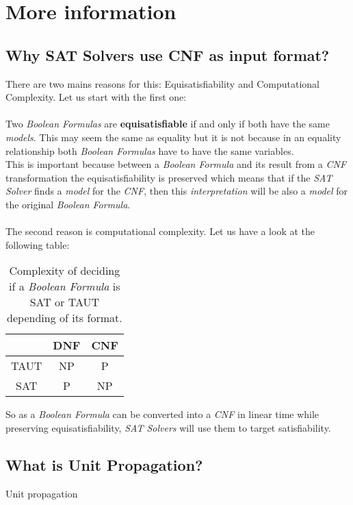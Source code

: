 
\chapter{More information} %

\label{AppendixA} %

\section{Why SAT Solvers use CNF as input format?}
\label{A.1}

There are two mains reasons for this: Equisatisfiability and Computational Complexity. Let us start with the first one: \\\\

Two \emph{Boolean Formulas} are \textbf{equisatisfiable} if and only if both have the same \emph{models}. This may seem the same as equality but it is not because in an equality relationship both \emph{Boolean Formulas} have to have the same variables. \\
This is important because between a \emph{Boolean Formula} and its result from a \emph{CNF} transformation the equisatisfiability is preserved which means that if the \emph{SAT Solver} finds a \emph{model} for the \emph{CNF}, then this \emph{interpretation} will be also a \emph{model} for the original \emph{Boolean Formula}.\\\\

The second reason is computational complexity. Let us have a look at the following table:

\begin{table}[h]
	\centering
	\begin{tabular}{c|c|c|}
		\cline{2-3}
		& DNF & CNF \\ \hline\hline
		\multicolumn{1}{|c||}{TAUT} & NP  & P   \\ \hline
		\multicolumn{1}{|c||}{SAT}  & P   & NP  \\ \hline
	\end{tabular}
	\caption{Complexity of deciding if a \emph{Boolean Formula} is SAT or TAUT depending of its format.}
	\label{my-label}
\end{table}


So as a \emph{Boolean Formula} can be converted into a \emph{CNF} in linear time while preserving equisatisfiability, \emph{SAT Solvers} will use them to target satisfiability.

\section{What is Unit Propagation?}
\label{A.2}
Unit propagation 